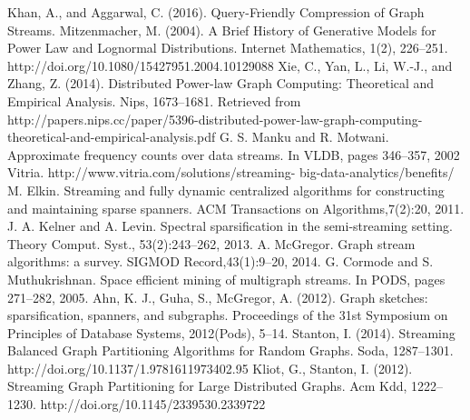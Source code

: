 \documentclass[conference]{IEEEtran}
\begin{document}
\begin{thebibliography}{1}
   Khan, A., and Aggarwal, C. (2016). Query-Friendly Compression of Graph Streams.
  Mitzenmacher, M. (2004). A Brief History of Generative Models for Power Law and Lognormal Distributions. Internet Mathematics, 1(2), 226–251. http://doi.org/10.1080/15427951.2004.10129088
  Xie, C., Yan, L., Li, W.-J., and Zhang, Z. (2014). Distributed Power-law Graph Computing: Theoretical and Empirical Analysis. Nips, 1673--1681. Retrieved from http://papers.nips.cc/paper/5396-distributed-power-law-graph-computing-theoretical-and-empirical-analysis.pdf
  G. S. Manku and R. Motwani. Approximate frequency counts over data streams. In VLDB, pages 346–357, 2002
   Vitria. http://www.vitria.com/solutions/streaming- big-data-analytics/benefits/
  M. Elkin. Streaming and fully dynamic centralized algorithms for constructing and maintaining sparse spanners. ACM Transactions on Algorithms,7(2):20, 2011.
   J. A. Kelner and A. Levin. Spectral sparsification in the semi-streaming setting. Theory Comput. Syst., 53(2):243–262, 2013.
  A. McGregor. Graph stream algorithms: a survey. SIGMOD Record,43(1):9–20, 2014.
  G. Cormode and S. Muthukrishnan. Space efficient mining of multigraph streams. In PODS, pages 271–282, 2005.
  Ahn, K. J., Guha, S.,  McGregor, A. (2012). Graph sketches: sparsification, spanners, and subgraphs. Proceedings of the 31st Symposium on Principles of Database Systems, 2012(Pods), 5–14.
  Stanton, I. (2014). Streaming Balanced Graph Partitioning Algorithms for Random Graphs. Soda, 1287–1301. http://doi.org/10.1137/1.9781611973402.95
  Kliot, G.,  Stanton, I. (2012). Streaming Graph Partitioning for Large Distributed Graphs. Acm Kdd, 1222–1230. http://doi.org/10.1145/2339530.2339722
  
\end{thebibliography}



\end{document}
